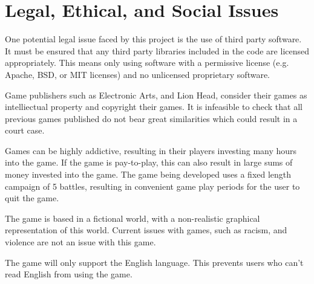 \section{Legal, Ethical, and Social Issues}
\label{section:professional_issues}

One potential legal issue faced by this project is the use of third party software.
It must be ensured that any third party libraries included in the code are licensed
appropriately. This means only using software with a permissive license (e.g. Apache, BSD, or MIT licenses) and no unlicensed proprietary software.

Game publishers such as Electronic Arts, and Lion Head, consider their games as intelliectual property and copyright their games.
It is infeasible to check that all previous games published do not bear great similarities which could result in a court case.

Games can be highly addictive, resulting in their players investing many hours into the game.
If the game is pay-to-play, this can also result in large sums of money invested into the game.
The game being developed uses a fixed length campaign of 5 battles, resulting in convenient game play periods for the user to quit the game.  

The game is based in a fictional world, with a non-realistic graphical representation of this world. Current issues with games, such as racism, and violence are not an issue with this game.

The game will only support the English language.
This prevents users who can't read English from using the game.


